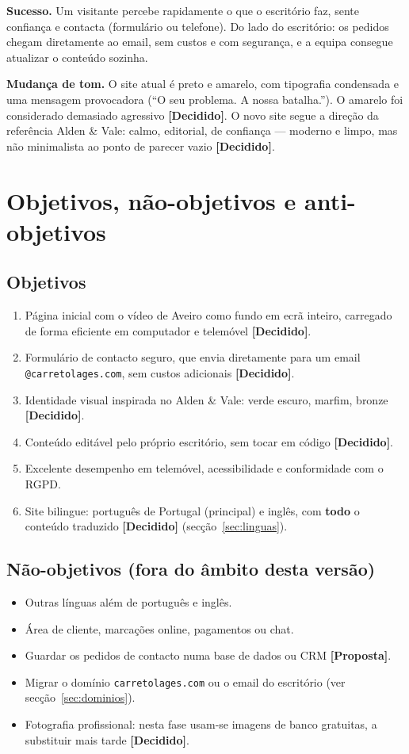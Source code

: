 \documentclass[11pt,a4paper]{article}
\newcommand{\decidido}{\textcolor{verde700}{\textbf{[Decidido]}}}
\newcommand{\proposta}{\textcolor{bronze}{\textbf{[Proposta]}}}
\begin{document}
\textbf{Sucesso.} Um visitante percebe rapidamente o que o escritório faz, sente confiança e contacta (formulário ou telefone). Do lado do escritório: os pedidos chegam diretamente ao email, sem custos e com segurança, e a equipa consegue atualizar o conteúdo sozinha.

\textbf{Mudança de tom.} O site atual é preto e amarelo, com tipografia condensada e uma mensagem provocadora (``O seu problema. A nossa batalha.''). O amarelo foi considerado demasiado agressivo \decidido. O novo site segue a direção da referência Alden \& Vale: calmo, editorial, de confiança --- moderno e limpo, mas não minimalista ao ponto de parecer vazio \decidido.

\section{Objetivos, não-objetivos e anti-objetivos}

\subsection{Objetivos}
\begin{enumerate}
  \item Página inicial com o vídeo de Aveiro como fundo em ecrã inteiro, carregado de forma eficiente em computador e telemóvel \decidido.
  \item Formulário de contacto seguro, que envia diretamente para um email \texttt{@carretolages.com}, sem custos adicionais \decidido.
  \item Identidade visual inspirada no Alden \& Vale: verde escuro, marfim, bronze \decidido.
  \item Conteúdo editável pelo próprio escritório, sem tocar em código \decidido.
  \item Excelente desempenho em telemóvel, acessibilidade e conformidade com o RGPD.
  \item Site bilingue: português de Portugal (principal) e inglês, com \textbf{todo} o conteúdo traduzido \decidido{} (secção~\ref{sec:linguas}).
\end{enumerate}

\subsection{Não-objetivos (fora do âmbito desta versão)}
\begin{itemize}
  \item Outras línguas além de português e inglês.
  \item Área de cliente, marcações online, pagamentos ou chat.
  \item Guardar os pedidos de contacto numa base de dados ou CRM \proposta.
  \item Migrar o domínio \texttt{carretolages.com} ou o email do escritório (ver secção~\ref{sec:dominios}).
  \item Fotografia profissional: nesta fase usam-se imagens de banco gratuitas, a substituir mais tarde \decidido.
\end{itemize}
\end{document}

